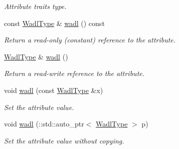 \begin{DoxyCompactItemize}
\begin{DoxyCompactList}\small\item\em Attribute traits type. \item\end{DoxyCompactList}\item 
const \hyperlink{classopenstack_1_1xml_1_1Version_a5a0dce1b88ef63c4fd363ef4f2754a79}{WadlType} \& \hyperlink{classopenstack_1_1xml_1_1Version_a2549a7e01824d16add62d44100080905}{wadl} () const 
\begin{DoxyCompactList}\small\item\em Return a read-\/only (constant) reference to the attribute. \item\end{DoxyCompactList}\item 
\hyperlink{classopenstack_1_1xml_1_1Version_a5a0dce1b88ef63c4fd363ef4f2754a79}{WadlType} \& \hyperlink{classopenstack_1_1xml_1_1Version_a672714888abb166114cab778ab686a04}{wadl} ()
\begin{DoxyCompactList}\small\item\em Return a read-\/write reference to the attribute. \item\end{DoxyCompactList}\item 
void \hyperlink{classopenstack_1_1xml_1_1Version_a7902c81843090dca8c0bc3d75a5cc5fd}{wadl} (const \hyperlink{classopenstack_1_1xml_1_1Version_a5a0dce1b88ef63c4fd363ef4f2754a79}{WadlType} \&x)
\begin{DoxyCompactList}\small\item\em Set the attribute value. \item\end{DoxyCompactList}\item 
void \hyperlink{classopenstack_1_1xml_1_1Version_a8fcff71bb1e449221d74575895963b90}{wadl} (::std::auto\_\-ptr$<$ \hyperlink{classopenstack_1_1xml_1_1Version_a5a0dce1b88ef63c4fd363ef4f2754a79}{WadlType} $>$ p)
\begin{DoxyCompactList}\small\item\em Set the attribute value without copying. \item\end{DoxyCompactList}\end{DoxyCompactItemize}
